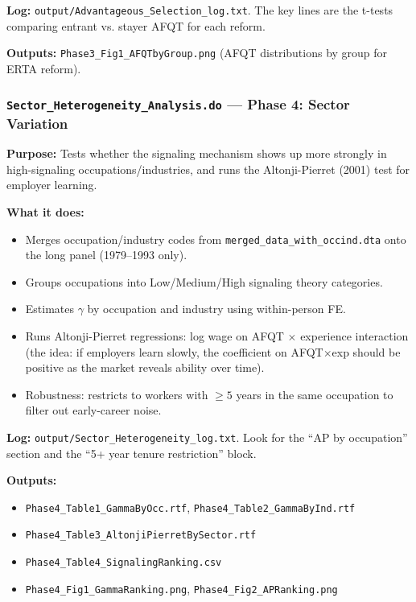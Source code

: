 \documentclass[11pt, letterpaper]{article}
\newcommand{\dofile}[1]{\texttt{#1}}
\newcommand{\logfile}[1]{\texttt{#1}}
\newcommand{\datafile}[1]{\texttt{#1}}
\newcommand{\outputfile}[1]{\texttt{#1}}
\begin{document}
\textbf{Log:} \logfile{output/Advantageous\_Selection\_log.txt}. The key lines are the t-tests comparing entrant vs. stayer AFQT for each reform.

\textbf{Outputs:} \outputfile{Phase3\_Fig1\_AFQTbyGroup.png} (AFQT distributions by group for ERTA reform).

\vspace{6pt}
\subsubsection{\dofile{Sector\_Heterogeneity\_Analysis.do} \textnormal{--- Phase 4: Sector Variation}}

\textbf{Purpose:} Tests whether the signaling mechanism shows up more strongly in high-signaling occupations/industries, and runs the Altonji-Pierret (2001) test for employer learning.

\textbf{What it does:}
\begin{itemize}
    \item Merges occupation/industry codes from \datafile{merged\_data\_with\_occind.dta} onto the long panel (1979--1993 only).
    \item Groups occupations into Low/Medium/High signaling theory categories.
    \item Estimates $\gamma$ by occupation and industry using within-person FE.
    \item Runs Altonji-Pierret regressions: log wage on AFQT $\times$ experience interaction (the idea: if employers learn slowly, the coefficient on AFQT$\times$exp should be positive as the market reveals ability over time).
    \item Robustness: restricts to workers with $\geq 5$ years in the same occupation to filter out early-career noise.
\end{itemize}

\textbf{Log:} \logfile{output/Sector\_Heterogeneity\_log.txt}. Look for the ``AP by occupation'' section and the ``5+ year tenure restriction'' block.

\textbf{Outputs:}
\begin{itemize}
    \item \outputfile{Phase4\_Table1\_GammaByOcc.rtf}, \outputfile{Phase4\_Table2\_GammaByInd.rtf}
    \item \outputfile{Phase4\_Table3\_AltonjiPierretBySector.rtf}
    \item \outputfile{Phase4\_Table4\_SignalingRanking.csv}
    \item \outputfile{Phase4\_Fig1\_GammaRanking.png}, \outputfile{Phase4\_Fig2\_APRanking.png}
\end{itemize}
\end{document}
